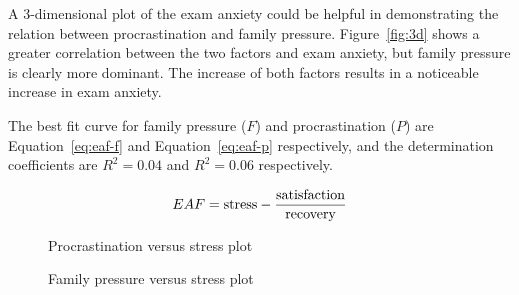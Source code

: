 \documentclass[12pt]{report}
\begin{document}
\begin{multicols}{2}
A 3-dimensional plot of the exam anxiety could be helpful in demonstrating
the relation between procrastination and family pressure. Figure~\ref{fig:3d}
shows a greater correlation between the two factors and exam anxiety, but family
pressure is clearly more dominant. The increase of both factors results in a
noticeable increase in exam anxiety.

The best fit curve for family pressure ($F$) and procrastination ($P$) are
Equation~\ref{eq:eaf-f} and Equation~\ref{eq:eaf-p} respectively, and the
determination coefficients are $R^2 = 0.04$ and $R^2 = 0.06$ respectively.

\begin{equation}
    EAF = \textnormal{stress} -
    \frac{\textnormal{satisfaction}}{\textnormal{recovery}}
    \label{eq:exam-anxiety}
\end{equation}

\begin{figure}[H]
            \caption{Procrastination versus stress plot}
            \label{fig:procrastination-stress}
        \end{figure}

\begin{figure}[H]
    \caption{Family pressure versus stress plot}
    \label{fig:family-stress}
\end{figure}


\end{multicols}
\end{document}
